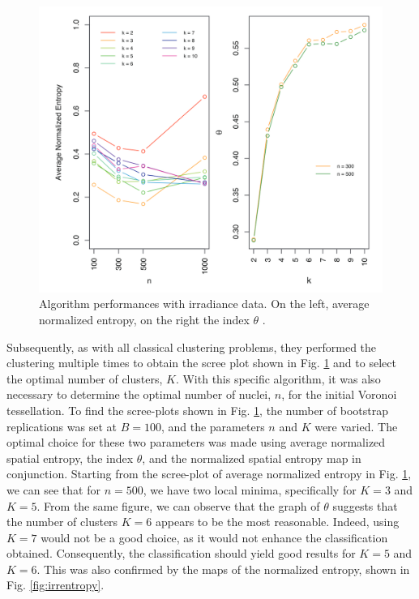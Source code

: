\begin{figure}
    \centering
    \includegraphics[scale=0.5]{Images/baggingscreeplot.png}
    \caption[Result on irradiance data.]{Algorithm performances with irradiance data. On the left, average normalized entropy, on the right the index $\theta$ \cite{secchi_bagging_2013}.}
    \label{fig:baggingscreeplot}
\end{figure}
Subsequently, as with all classical clustering problems, they performed the clustering multiple times to obtain the scree plot shown in Fig. \ref{fig:baggingscreeplot} and to select the optimal number of clusters, $K$. With this specific algorithm, it was also necessary to determine the optimal number of nuclei, $n$, for the initial Voronoi tessellation. To find the scree-plots shown in Fig. \ref{fig:baggingscreeplot}, the number of bootstrap replications was set at $B=100$, and the parameters $n$ and $K$ were varied. The optimal choice for these two parameters was made using average normalized spatial entropy, the index $\theta$, and the normalized spatial entropy map in conjunction. Starting from the scree-plot of average normalized entropy in Fig. \ref{fig:baggingscreeplot}, we can see that for $n=500$, we have two local minima, specifically for $K=3$ and $K=5$. From the same figure, we can observe that the graph of $\theta$ suggests that the number of clusters $K=6$ appears to be the most reasonable. Indeed, using $K=7$ would not be a good choice, as it would not enhance the classification obtained. Consequently, the classification should yield good results for $K=5$ and $K=6$. This was also confirmed by the maps of the normalized entropy, shown in Fig. \ref{fig:irrentropy}.
